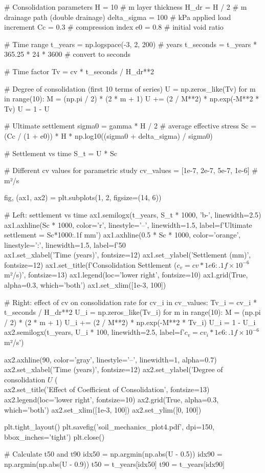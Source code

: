 \documentclass[11pt,a4paper]{article}
\begin{document}
\begin{pycode}
# Consolidation parameters
H = 10  # m layer thickness
H_dr = H / 2  # m drainage path (double drainage)
delta_sigma = 100  # kPa applied load increment
Cc = 0.3  # compression index
e0 = 0.8  # initial void ratio

# Time range
t_years = np.logspace(-3, 2, 200)  # years
t_seconds = t_years * 365.25 * 24 * 3600  # convert to seconds

# Time factor
Tv = cv * t_seconds / H_dr**2

# Degree of consolidation (first 10 terms of series)
U = np.zeros_like(Tv)
for m in range(10):
    M = (np.pi / 2) * (2 * m + 1)
    U += (2 / M**2) * np.exp(-M**2 * Tv)
U = 1 - U

# Ultimate settlement
sigma0 = gamma * H / 2  # average effective stress
Sc = (Cc / (1 + e0)) * H * np.log10((sigma0 + delta_sigma) / sigma0)

# Settlement vs time
S_t = U * Sc

# Different cv values for parametric study
cv_values = [1e-7, 2e-7, 5e-7, 1e-6]  # m²/s

fig, (ax1, ax2) = plt.subplots(1, 2, figsize=(14, 6))

# Left: settlement vs time
ax1.semilogx(t_years, S_t * 1000, 'b-', linewidth=2.5)
ax1.axhline(Sc * 1000, color='r', linestyle='--', linewidth=1.5,
            label=f'Ultimate settlement = {Sc*1000:.1f} mm')
ax1.axhline(0.5 * Sc * 1000, color='orange', linestyle=':', linewidth=1.5,
            label=f'50\\%
ax1.set_xlabel('Time (years)', fontsize=12)
ax1.set_ylabel('Settlement (mm)', fontsize=12)
ax1.set_title(f'Consolidation Settlement ($c_v={cv*1e6:.1f}×10^{{-6}}$ m²/s)', fontsize=13)
ax1.legend(loc='lower right', fontsize=10)
ax1.grid(True, alpha=0.3, which='both')
ax1.set_xlim([1e-3, 100])

# Right: effect of cv on consolidation rate
for cv_i in cv_values:
    Tv_i = cv_i * t_seconds / H_dr**2
    U_i = np.zeros_like(Tv_i)
    for m in range(10):
        M = (np.pi / 2) * (2 * m + 1)
        U_i += (2 / M**2) * np.exp(-M**2 * Tv_i)
    U_i = 1 - U_i
    ax2.semilogx(t_years, U_i * 100, linewidth=2.5,
                 label=f'$c_v={cv_i*1e6:.1f}×10^{{-6}}$ m²/s')

ax2.axhline(90, color='gray', linestyle='--', linewidth=1, alpha=0.7)
ax2.set_xlabel('Time (years)', fontsize=12)
ax2.set_ylabel('Degree of consolidation $U$ (\\%
ax2.set_title('Effect of Coefficient of Consolidation', fontsize=13)
ax2.legend(loc='lower right', fontsize=10)
ax2.grid(True, alpha=0.3, which='both')
ax2.set_xlim([1e-3, 100])
ax2.set_ylim([0, 100])

plt.tight_layout()
plt.savefig('soil_mechanics_plot4.pdf', dpi=150, bbox_inches='tight')
plt.close()

# Calculate t50 and t90
idx50 = np.argmin(np.abs(U - 0.5))
idx90 = np.argmin(np.abs(U - 0.9))
t50 = t_years[idx50]
t90 = t_years[idx90]
\end{pycode}
\end{document}
